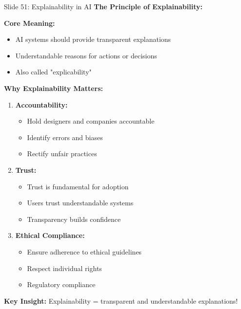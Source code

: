 \documentclass[8pt]{beamer}
\begin{document}
	\begin{frame}{Slide 51: Explainability in AI}
		\fontsize{6.5}{7.5}\selectfont
		\textbf{The Principle of Explainability:}
		
		\vspace{0.1cm}
		\textbf{Core Meaning:}
		\begin{itemize}
			\item AI systems should provide transparent explanations
			\item Understandable reasons for actions or decisions
			\item Also called "explicability"
		\end{itemize}
		
		\vspace{0.1cm}
		\textbf{Why Explainability Matters:}
		\begin{enumerate}
			\item \textbf{Accountability:}
			\begin{itemize}
				\item Hold designers and companies accountable
				\item Identify errors and biases
				\item Rectify unfair practices
			\end{itemize}
			\item \textbf{Trust:}
			\begin{itemize}
				\item Trust is fundamental for adoption
				\item Users trust understandable systems
				\item Transparency builds confidence
			\end{itemize}
			\item \textbf{Ethical Compliance:}
			\begin{itemize}
				\item Ensure adherence to ethical guidelines
				\item Respect individual rights
				\item Regulatory compliance
			\end{itemize}
		\end{enumerate}
		
		\textcolor{myblue}{\textbf{Key Insight:}} Explainability = \textcolor{myblue}{transparent and understandable explanations}!
	\end{frame}
	
\end{document}

